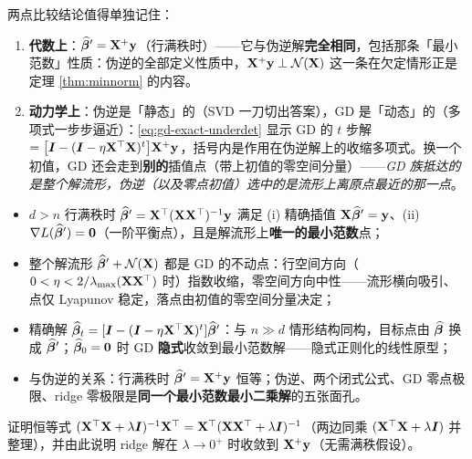 两点比较结论值得单独记住：

\begin{enumerate}[label=(\arabic*)]
  \item \textbf{代数上}：$\widehat{\bm{\beta}}' = \mathbf{X}^+\mathbf{y}$（行满秩时）——它与伪逆解\textbf{完全相同}，包括那条「最小范数」性质：伪逆的全部定义性质中，$\mathbf{X}^+\mathbf{y} \perp \mathcal{N}(\mathbf{X})$ 这一条在欠定情形正是定理 \ref{thm:minnorm} 的内容。
  \item \textbf{动力学上}：伪逆是「静态」的（SVD 一刀切出答案），GD 是「动态」的（多项式一步步逼近）：\eqref{eq:gd-exact-underdet} 显示 GD 的 $t$ 步解 $= \big[\bm{I} - (\bm{I} - \eta\mathbf{X}^\top\mathbf{X})^t\big]\mathbf{X}^+\mathbf{y}$，括号内是作用在伪逆解上的收缩多项式。换一个初值，GD 还会走到\textbf{别的}插值点（带上初值的零空间分量）——\textit{GD 族抵达的是整个解流形，伪逆（以及零点初值）选中的是流形上离原点最近的那一点}。
\end{enumerate}

\begin{keybox}[本章要点]
\begin{itemize}
  \item $d > n$ 行满秩时 $\widehat{\bm{\beta}}' = \mathbf{X}^\top(\mathbf{X}\mathbf{X}^\top)^{-1}\mathbf{y}$ 满足 (i) 精确插值 $\mathbf{X}\widehat{\bm{\beta}}' = \mathbf{y}$、(ii) $\nabla L(\widehat{\bm{\beta}}') = \mathbf{0}$（一阶平衡点），且是解流形上\textbf{唯一的最小范数}点；
  \item 整个解流形 $\widehat{\bm{\beta}}' + \mathcal{N}(\mathbf{X})$ 都是 GD 的不动点：行空间方向（$0 < \eta < 2/\lambda_{\max}(\mathbf{X}\mathbf{X}^\top)$ 时）指数收缩，零空间方向中性——流形横向吸引、点仅 Lyapunov 稳定，落点由初值的零空间分量决定；
  \item 精确解 $\widehat{\bm{\beta}}_t = [\bm{I} - (\bm{I} - \eta\mathbf{X}^\top\mathbf{X})^t]\widehat{\bm{\beta}}'$：与 $n \gg d$ 情形结构同构，目标点由 $\widehat{\bm{\beta}}$ 换成 $\widehat{\bm{\beta}}'$；$\widehat{\bm{\beta}}_0 = \mathbf{0}$ 时 GD \textbf{隐式}收敛到最小范数解——隐式正则化的线性原型；
  \item 与伪逆的关系：行满秩时 $\widehat{\bm{\beta}}' = \mathbf{X}^+\mathbf{y}$ 恒等；伪逆、两个闭式公式、GD 零点极限、ridge 零极限是\textbf{同一个最小范数最小二乘解}的五张面孔。
\end{itemize}
\end{keybox}

\begin{exercise}\label{ex:ridge-dual}
证明恒等式 $(\mathbf{X}^\top\mathbf{X} + \lambda\bm{I})^{-1}\mathbf{X}^\top = \mathbf{X}^\top(\mathbf{X}\mathbf{X}^\top + \lambda\bm{I})^{-1}$（两边同乘 $(\mathbf{X}^\top\mathbf{X} + \lambda\bm{I})$ 并整理），并由此说明 ridge 解在 $\lambda \to 0^+$ 时收敛到 $\mathbf{X}^+\mathbf{y}$（无需满秩假设）。
\end{exercise}

